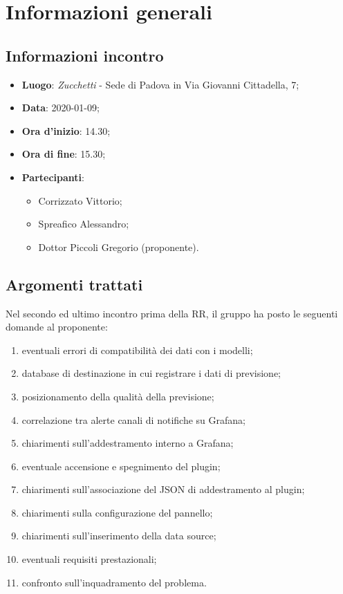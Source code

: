 \section{Informazioni generali}
    \subsection{Informazioni incontro}
        \begin{itemize}
            \item \textbf{Luogo}: \textit{Zucchetti} - Sede di Padova in Via Giovanni Cittadella, 7;
            \item \textbf{Data}: 2020-01-09;
            \item \textbf{Ora d'inizio}: 14.30;
            \item \textbf{Ora di fine}: 15.30;
            \item \textbf{Partecipanti}: \begin{itemize}
                \item Corrizzato Vittorio;
                \item Spreafico Alessandro;
                \item Dottor Piccoli Gregorio (proponente).
            \end{itemize}
        \end{itemize}
    \subsection{Argomenti trattati}
        Nel secondo ed ultimo incontro prima della RR, il gruppo ha posto le seguenti domande al proponente:
        \begin{enumerate}
            \item eventuali errori di compatibilità dei dati con i modelli;
            \item database di destinazione in cui registrare i dati di previsione;
            \item posizionamento della qualità della previsione;
            \item correlazione tra alert\glosp e canali di notifiche su Grafana\glo;
            \item chiarimenti sull'addestramento interno a Grafana\glo;
            \item eventuale accensione e spegnimento del plugin;
            \item chiarimenti sull'associazione del JSON di addestramento al plugin;
            \item chiarimenti sulla configurazione del pannello;
            \item chiarimenti sull'inserimento della data source;
            \item eventuali requisiti prestazionali;
            \item confronto sull'inquadramento del problema.
        \end{enumerate}
